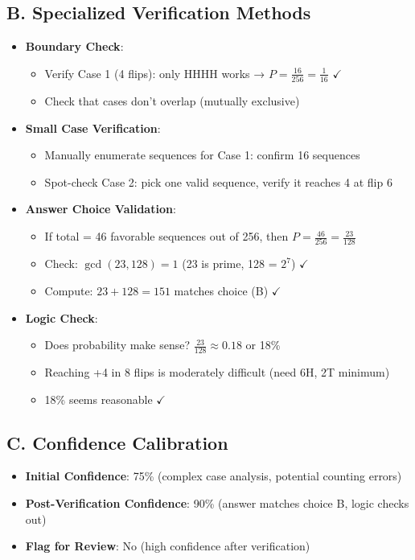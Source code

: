 \documentclass[]{article}
\begin{document}
\begin{verificationbox}
\subsection*{B. Specialized Verification Methods}
\begin{itemize}[leftmargin=*]
    \item \textbf{Boundary Check}: 
    \begin{itemize}
        \item Verify Case 1 (4 flips): only HHHH works → $P = \frac{16}{256} = \frac{1}{16}$ $\checkmark$
        \item Check that cases don't overlap (mutually exclusive)
    \end{itemize}
    \item \textbf{Small Case Verification}:
    \begin{itemize}
        \item Manually enumerate sequences for Case 1: confirm 16 sequences
        \item Spot-check Case 2: pick one valid sequence, verify it reaches 4 at flip 6
    \end{itemize}
    \item \textbf{Answer Choice Validation}:
    \begin{itemize}
        \item If total = 46 favorable sequences out of 256, then $P = \frac{46}{256} = \frac{23}{128}$
        \item Check: $\gcd(23, 128) = 1$ (23 is prime, 128 = $2^7$) $\checkmark$
        \item Compute: $23 + 128 = 151$ matches choice (B) $\checkmark$
    \end{itemize}
    \item \textbf{Logic Check}:
    \begin{itemize}
        \item Does probability make sense? $\frac{23}{128} \approx 0.18$ or 18\%
        \item Reaching +4 in 8 flips is moderately difficult (need 6H, 2T minimum)
        \item 18\% seems reasonable $\checkmark$
    \end{itemize}
\end{itemize}

\subsection*{C. Confidence Calibration}
\begin{itemize}[leftmargin=*]
    \item \textbf{Initial Confidence}: 75\% (complex case analysis, potential counting errors)
    \item \textbf{Post-Verification Confidence}: 90\% (answer matches choice B, logic checks out)
    \item \textbf{Flag for Review}: No (high confidence after verification)
\end{itemize}
\end{verificationbox}
\end{document}
